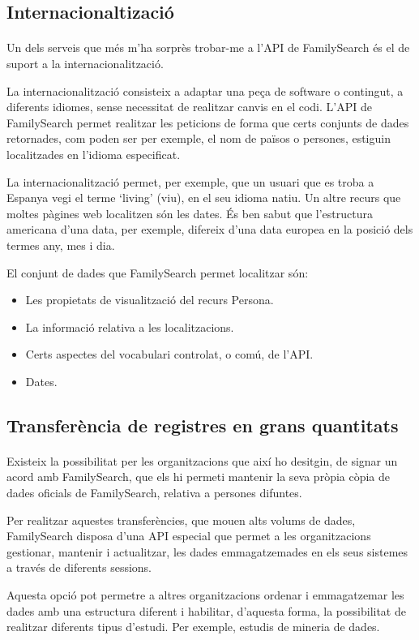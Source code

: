     \subsection{Internacionaltizació}

        \paragraph{}
        Un dels serveis que més m'ha sorprès trobar-me a l'API de FamilySearch és el de suport a la internacionalització.

        La internacionalització consisteix a adaptar una peça de software o contingut, a diferents idiomes, sense necessitat de realitzar canvis en el codi. L'API de FamilySearch permet realitzar les peticions de forma que certs conjunts de dades retornades, com poden ser per exemple, el nom de països o persones, estiguin localitzades en l'idioma especificat.

        La internacionalització permet, per exemple, que un usuari que es troba a Espanya vegi el terme `living' (viu), en el seu idioma natiu. Un altre recurs que moltes pàgines web localitzen són les dates. És ben sabut que l'estructura americana d'una data, per exemple, difereix d'una data europea en la posició dels termes any, mes i dia.

        El conjunt de dades que FamilySearch permet localitzar són:

        \begin{itemize}
            \item Les propietats de visualització del recurs Persona.
            \item La informació relativa a les localitzacions.
            \item Certs aspectes del vocabulari controlat, o comú, de l'API.
            \item Dates.
        \end{itemize}


    \subsection{Transferència de registres en grans quantitats}

        \paragraph{}
        Existeix la possibilitat per les organitzacions que així ho desitgin, de signar un acord amb FamilySearch, que els hi permeti mantenir la seva pròpia còpia de dades oficials de FamilySearch, relativa a persones difuntes.

        Per realitzar aquestes transferències, que mouen alts volums de dades, FamilySearch disposa d'una API especial que permet a les organitzacions gestionar, mantenir i actualitzar, les dades emmagatzemades en els seus sistemes a través de diferents sessions.

        Aquesta opció pot permetre a altres organitzacions ordenar i emmagatzemar les dades amb una estructura diferent i habilitar, d'aquesta forma, la possibilitat de realitzar diferents tipus d'estudi. Per exemple, estudis de mineria de dades.

